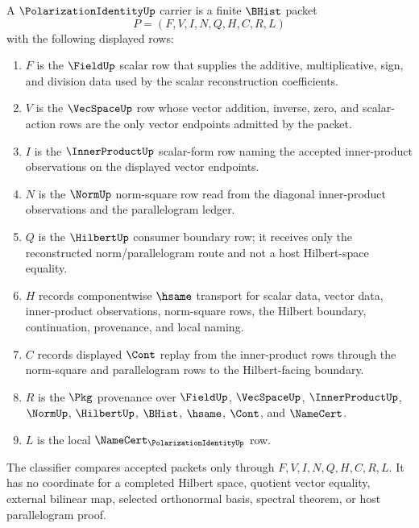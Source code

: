 \begin{definition}
\label{def:polarization-identity-carrier}
A $\PolarizationIdentityUp$ carrier is a finite $\BHist$ packet
$$
P=(F,V,I,N,Q,H,C,R,L)
$$
with the following displayed rows:
\begin{enumerate}
\item $F$ is the $\FieldUp$ scalar row that supplies the additive, multiplicative, sign, and division data used by the scalar reconstruction coefficients.
\item $V$ is the $\VecSpaceUp$ row whose vector addition, inverse, zero, and scalar-action rows are the only vector endpoints admitted by the packet.
\item $I$ is the $\InnerProductUp$ scalar-form row naming the accepted inner-product observations on the displayed vector endpoints.
\item $N$ is the $\NormUp$ norm-square row read from the diagonal inner-product observations and the parallelogram ledger.
\item $Q$ is the $\HilbertUp$ consumer boundary row; it receives only the reconstructed norm/parallelogram route and not a host Hilbert-space equality.
\item $H$ records componentwise $\hsame$ transport for scalar data, vector data, inner-product observations, norm-square rows, the Hilbert boundary, continuation, provenance, and local naming.
\item $C$ records displayed $\Cont$ replay from the inner-product rows through the norm-square and parallelogram rows to the Hilbert-facing boundary.
\item $R$ is the $\Pkg$ provenance over $\FieldUp$, $\VecSpaceUp$, $\InnerProductUp$, $\NormUp$, $\HilbertUp$, $\BHist$, $\hsame$, $\Cont$, and $\NameCert$.
\item $L$ is the local $\NameCert_{\PolarizationIdentityUp}$ row.
\end{enumerate}
The classifier compares accepted packets only through $F,V,I,N,Q,H,C,R,L$. It has no coordinate for a completed Hilbert space, quotient vector equality, external bilinear map, selected orthonormal basis, spectral theorem, or host parallelogram proof.
\end{definition}

